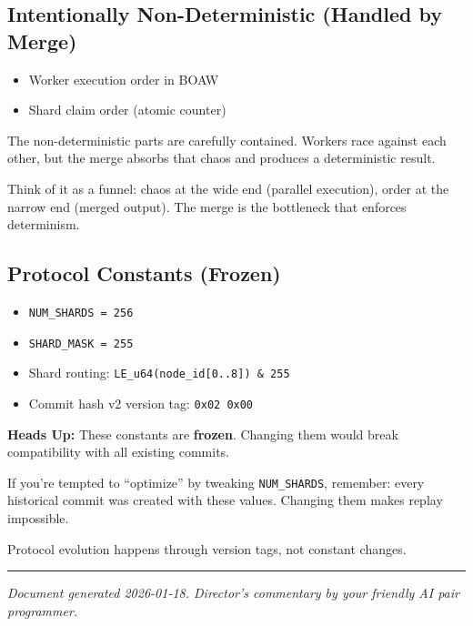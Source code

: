 \documentclass[11pt]{book}
\providecommand{\tightlist}{%
  \setlength{\itemsep}{0pt}\setlength{\parskip}{0pt}}
\newenvironment{directors}
{\begin{mdframed}[
  linecolor=blue!60,
  linewidth=2pt,
  leftline=true,
  rightline=false,
  topline=false,
  bottomline=false,
  backgroundcolor=blue!3,
  innerleftmargin=12pt,
  innerrightmargin=10pt,
  innertopmargin=8pt,
  innerbottommargin=8pt,
  skipabove=12pt,
  skipbelow=12pt
]\small\sffamily\color{blue!70!black}}
{\end{mdframed}}
\newenvironment{watchout}
{\begin{mdframed}[
  linecolor=orange!80!black,
  linewidth=2pt,
  leftline=true,
  rightline=false,
  topline=false,
  bottomline=false,
  backgroundcolor=orange!5,
  innerleftmargin=12pt,
  innerrightmargin=10pt,
  innertopmargin=8pt,
  innerbottommargin=8pt,
  skipabove=12pt,
  skipbelow=12pt
]\small\sffamily\color{orange!70!black}\textbf{Heads Up:} }
{\end{mdframed}}
\begin{document}
\subsection{Intentionally Non-Deterministic (Handled by Merge)}

\begin{itemize}
\tightlist
\item Worker execution order in BOAW
\item Shard claim order (atomic counter)
\end{itemize}

\begin{directors}
The non-deterministic parts are carefully contained. Workers race against each other, but the merge absorbs that chaos and produces a deterministic result.

Think of it as a funnel: chaos at the wide end (parallel execution), order at the narrow end (merged output). The merge is the bottleneck that enforces determinism.
\end{directors}

\subsection{Protocol Constants (Frozen)}

\begin{itemize}
\tightlist
\item \texttt{NUM\_SHARDS = 256}
\item \texttt{SHARD\_MASK = 255}
\item Shard routing: \texttt{LE\_u64(node\_id[0..8]) \& 255}
\item Commit hash v2 version tag: \texttt{0x02 0x00}
\end{itemize}

\begin{watchout}
These constants are \textbf{frozen}. Changing them would break compatibility with all existing commits.

If you're tempted to ``optimize'' by tweaking \texttt{NUM\_SHARDS}, remember: every historical commit was created with these values. Changing them makes replay impossible.

Protocol evolution happens through version tags, not constant changes.
\end{watchout}

\begin{center}\rule{0.5\linewidth}{0.5pt}\end{center}

\emph{Document generated 2026-01-18. Director's commentary by your friendly AI pair programmer.}

\backmatter
\end{document}
